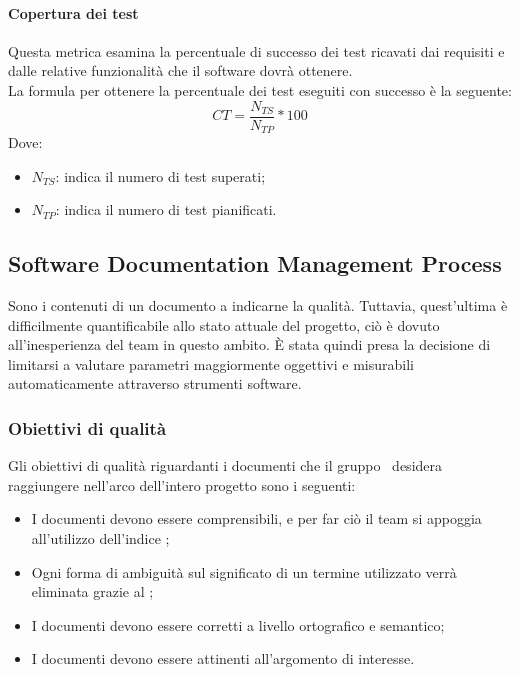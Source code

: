 \documentclass[../PianoDiQualifica.tex]{subfiles}
\begin{document}
				\paragraph{Copertura dei test}
				Questa metrica esamina la percentuale di successo dei test ricavati dai requisiti e dalle relative funzionalità che il software dovrà ottenere.\\La formula per ottenere la percentuale dei test eseguiti con successo è la seguente:
				\begin{equation*}
					CT = \frac{N_{TS}}{N_{TP}} * 100
				\end{equation*}
				Dove:
				\begin{itemize}
					\item \textbf{$N_{TS}$}: indica il numero di test superati;
					\item \textbf{$N_{TP}$}: indica il numero di test pianificati.
				\end{itemize}
				
		
		\subsection{Software Documentation Management Process}
		Sono i contenuti di un documento a indicarne la qualità. Tuttavia, quest'ultima è difficilmente quantificabile allo stato attuale del progetto, ciò è dovuto all'inesperienza del team in questo ambito. È stata quindi presa la decisione di limitarsi a valutare parametri maggiormente oggettivi e misurabili automaticamente attraverso strumenti software.
		
			\subsubsection{Obiettivi di qualità}
			Gli obiettivi di qualità riguardanti i documenti che il gruppo \kpanic\ desidera raggiungere nell'arco dell'intero progetto sono i seguenti:
			\begin{itemize}
				\item I documenti devono essere comprensibili, e per far ciò il team si appoggia all'utilizzo dell'indice ;
				\item Ogni forma di ambiguità sul significato di un termine utilizzato verrà eliminata grazie al \glossario;
				\item I documenti devono essere corretti a livello ortografico e semantico;
				\item I documenti devono essere attinenti all'argomento di interesse.
			\end{itemize}
			
\end{document}

